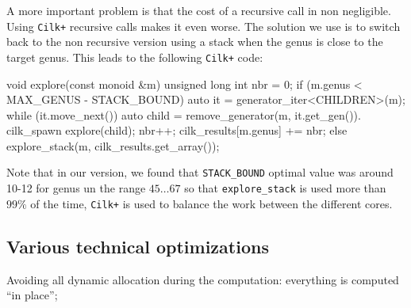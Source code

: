 \documentclass[reqno,11pt]{amsart}
\theoremstyle{plain}
\theoremstyle{definition}
\renewcommand{\leq}{\leqslant}
\newcommand{\NN}{\mathbb{N}}
\renewcommand{\tt}[1]{\texttt{#1}}
\begin{document}
A more important problem is that the cost of a recursive call in non
negligible. Using \tt{Cilk+} recursive calls makes it even worse. The solution
we use is to switch back to the non recursive version using a stack when the
genus is close to the target genus. This leads to the following \tt{Cilk+} code:
\begin{listing}{1}
void explore(const monoid &m) {
  unsigned long int nbr = 0;
  if (m.genus < MAX_GENUS - STACK_BOUND) {
    auto it = generator_iter<CHILDREN>(m);
    while (it.move_next()) {
      auto child = remove_generator(m, it.get_gen()).
      cilk_spawn explore(child);
      nbr++;
    }
    cilk_results[m.genus] += nbr;
  }
  else explore_stack(m, cilk_results.get_array());
}
\end{listing}
Note that in our version, we found that \tt{STACK\_BOUND} optimal value was
around 10-12 for genus un the range $45\dots 67$ so that \tt{explore\_stack}
is used more than $99\%$ of the time, \tt{Cilk+} is used to balance the work
between the different cores.

\subsection{Various technical optimizations}

Avoiding all dynamic allocation during the computation: everything is computed
``in place'';



\end{document}
